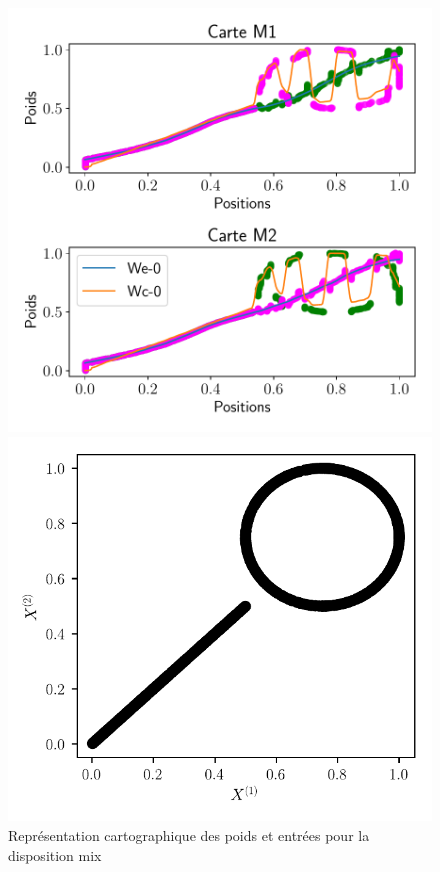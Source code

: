 \documentclass[../main]{subfiles}
\begin{document}
\begin{figure}
	\begin{minipage}{0.66\textwidth}
		\includegraphics[width=\textwidth]{2som_mix_w.pdf}
	\caption{Représentation cartographique des poids et entrées pour la disposition mix}
	\end{minipage}
	\begin{minipage}{0.33\textwidth}
		\includegraphics[width=\textwidth]{2som_mix_in.pdf}
	\end{minipage}
\end{figure}
\end{document}
